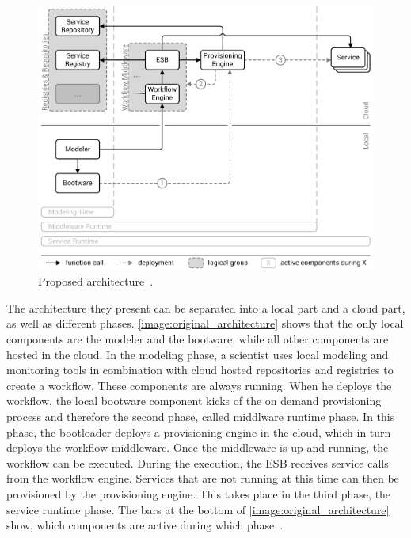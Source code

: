\begin{figure}[!htbp]
	\centering
	\includegraphics[resolution=600]{related/assets/original_architecture}
	\caption{Proposed architecture~\autocite[based on][]{provisioning:ondemand}.}
	\label{image:original_architecture}
\end{figure}

The architecture they present can be separated into a local part and a cloud part, as well as different phases.
\autoref{image:original_architecture} shows that the only local components are the modeler and the bootware, while all other components are hosted in the cloud.
In the modeling phase, a scientist uses local modeling and monitoring tools in combination with cloud hosted repositories and registries to create a workflow.
These components are always running.
When he deploys the workflow, the local bootware component kicks of the on demand provisioning process and therefore the second phase, called middlware runtime phase.
In this phase, the bootloader deploys a provisioning engine in the cloud, which in turn deploys the workflow middleware.
Once the middleware is up and running, the workflow can be executed. During the execution, the ESB receives service calls from the workflow engine.
Services that are not running at this time can then be provisioned by the provisioning engine.
This takes place in the third phase, the service runtime phase.
The bars at the bottom of \autoref{image:original_architecture} show, which components are active during which phase~\autocite{provisioning:ondemand}.

